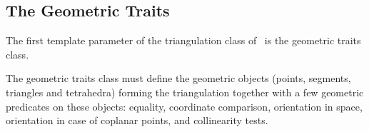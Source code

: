 








\subsection{The Geometric Traits}
\label{Triangulation3-sec-Traits}

The first template parameter of the triangulation class
 of \cgal\ is the geometric traits class.

The geometric traits class must define the geometric
objects (points, segments, triangles and tetrahedra) forming the
triangulation together with a few geometric predicates on these objects:
equality, coordinate comparison, orientation in space, orientation
in case of coplanar points, and collinearity tests.

